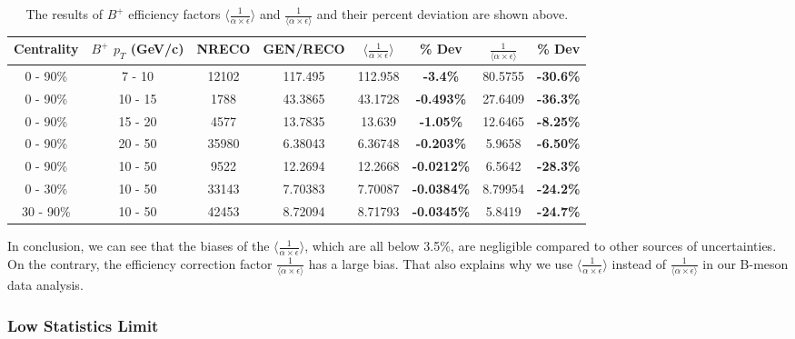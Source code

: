 \begin{table}[h]
\begin{center}
\caption{The results of $B^+$ efficiency factors $\langle \frac{1}{\alpha \times \epsilon} \rangle$ and $\frac{1}{\langle \alpha \times \epsilon \rangle}$ and their percent deviation are shown above.}
\vspace{1em}
\label{BPHighStat}
  \begin{tabular}{| c | c |c |c |c | c |  c| c|}
    \hline
     Centrality &  $B^+$   $p_T$ (GeV/c) & NRECO & GEN/RECO &  $\langle \frac{1}{\alpha \times \epsilon} \rangle$  & \% Dev & $\frac{1}{\langle \alpha \times \epsilon \rangle}$ &  \% Dev \\
    \hline
    \hline
0 - 90\% & 7 - 10 & 12102 & 117.495 & 112.958 & \textbf{-3.4\% }& 80.5755 &  \textbf{-30.6\% }   \\ 
0 - 90\% & 10 - 15 & 1788 & 43.3865 & 43.1728 & \textbf{-0.493\% }& 27.6409 &  \textbf{-36.3\% }   \\ 
0 - 90\% & 15 - 20 & 4577 & 13.7835 & 13.639 & \textbf{-1.05\% }& 12.6465 &  \textbf{-8.25\% }   \\ 
0 - 90\% & 20 - 50 & 35980 & 6.38043 & 6.36748 & \textbf{-0.203\% }& 5.9658 &  \textbf{-6.50\% }   \\ 
0 - 90\% & 10 - 50 & 9522 & 12.2694 & 12.2668 & \textbf{-0.0212\% }& 6.5642 &  \textbf{-28.3\% }   \\ 
0 - 30\% & 10 - 50 & 33143 & 7.70383 & 7.70087 & \textbf{-0.0384\% }& 8.79954 &  \textbf{-24.2\% }   \\ 
30 - 90\% & 10 - 50 & 42453 & 8.72094 & 8.71793 & \textbf{-0.0345\% }& 5.8419 &  \textbf{-24.7\% }   \\ 
    \hline
    \hline
\end{tabular}
\end{center}
\end{table}


In conclusion, we can see that the biases of the $\langle \frac{1}{\alpha \times \epsilon}\rangle$, which are all below 3.5\%, are negligible compared to other sources of uncertainties. On the contrary, the efficiency correction factor $\frac{1}{\langle \alpha \times \epsilon \rangle}$ has a large bias. That also explains why we use $\langle \frac{1}{\alpha \times \epsilon}\rangle$ instead of $\frac{1}{\langle \alpha \times \epsilon \rangle}$ in our B-meson data analysis.



\subsubsection{Low Statistics Limit}

